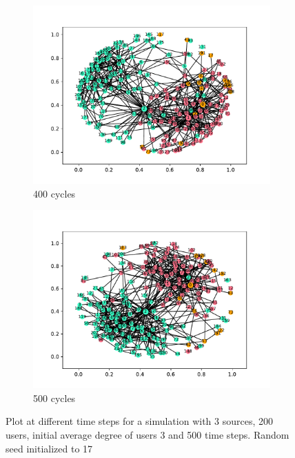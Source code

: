 \begin{figure}
  \begin{subfigure}[t]{.45\textwidth}
    \centering
    \includegraphics[trim={1cm .5cm 1cm 1cm}, clip, width=\linewidth]{img/pdf/plot-0400.pdf} 
    \caption{400 cycles}
    \label{fig:400}
  \end{subfigure}
  \begin{subfigure}[t]{.45\textwidth}
    \centering
    \includegraphics[trim={1cm .5cm 1cm 1cm}, clip, width=\linewidth]{img/pdf/plot-0500.pdf} 
    \caption{500 cycles}
    \label{fig:500}
  \end{subfigure}
 
  \caption{Plot at different time steps for a simulation with 3 sources, 200 users, initial average degree of users 3 and 500 time steps. Random seed initialized to 17}
\end{figure}

